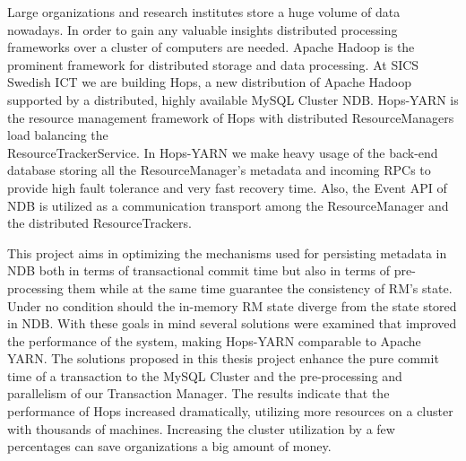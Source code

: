 Large organizations and research institutes store a huge volume of data nowadays.
In order to gain any valuable insights distributed processing frameworks over a
cluster of computers are needed. Apache Hadoop is the prominent framework for distributed
storage and data processing. At SICS Swedish ICT we are building Hops, a new distribution
of Apache Hadoop supported by a distributed, highly available MySQL
Cluster NDB. Hops-YARN is the resource management framework of Hops
with distributed ResourceManagers load balancing the\\
ResourceTrackerService. In Hops-YARN we make heavy usage of the
back-end database storing all the ResourceManager's metadata and
incoming RPCs to provide high fault tolerance and very fast recovery
time. Also, the Event API of NDB is utilized as a
communication transport among the ResourceManager and the distributed
ResourceTrackers.

This project aims in optimizing the mechanisms used for persisting
metadata in NDB both in terms of transactional commit time but also
in terms of pre-processing them while at the same time guarantee the
consistency of RM's state. Under no condition should the in-memory RM
state diverge from the state stored in NDB. With these goals in mind
several solutions were examined that improved the performance of the
system, making Hops-YARN comparable to Apache YARN. The solutions
proposed in this thesis project enhance the pure commit time of a
transaction to the MySQL Cluster and the pre-processing and parallelism
of our Transaction Manager. The results indicate that the performance
of Hops increased dramatically, utilizing more resources on a cluster
with thousands of machines. Increasing the cluster utilization by a
few percentages can save organizations a big amount of money.
